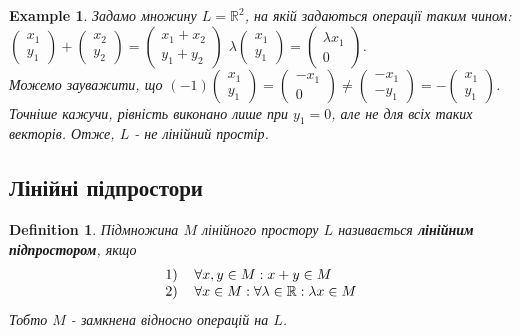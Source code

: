 \documentclass[a4paper, 10pt]{article}
\theoremstyle{theoremdd}
\theoremstyle{theoremdd}
\newtheorem{definition}[theorem]{Definition}
\theoremstyle{theoremdd}
\theoremstyle{theoremdd}
\newtheorem{example}[theorem]{Example}
\theoremstyle{theoremdd}
\theoremstyle{theoremdd}
\theoremstyle{theoremdd}
\theoremstyle{theoremdd}
\begin{document}
	\begin{example}
	Задамо множину $L = \mathbb{R}^2$, на якій задаються операції таким чином:\\
	$\begin{pmatrix}
	x_1 \\ y_1
	\end{pmatrix} + \begin{pmatrix}
	x_2 \\ y_2
	\end{pmatrix} = \begin{pmatrix}
	x_1 + x_2 \\ y_1+y_2
	\end{pmatrix}$ \hspace{1cm} $\lambda \begin{pmatrix}
	x_1 \\ y_1
	\end{pmatrix} = \begin{pmatrix}
	\lambda x_1 \\ 0
	\end{pmatrix}$.\\
	Можемо зауважити, що $(-1) \begin{pmatrix}
	x_1 \\ y_1
	\end{pmatrix} = \begin{pmatrix}
	-x_1 \\ 0
	\end{pmatrix} \neq \begin{pmatrix}
	-x_1 \\ -y_1
	\end{pmatrix} = - \begin{pmatrix}
	x_1 \\ y_1
	\end{pmatrix}$. Точніше кажучи, рівність виконано лише при $y_1 = 0$, але не для всіх таких векторів. Отже, $L$ - не лінійний простір.
	\end{example}
	
	\subsection{Лінійні підпростори}
	\begin{definition}
	Підмножина $M$ лінійного простору $L$ називається \textbf{лінійним підпростором}, якщо
	\begin{align*}
	\begin{tabular}{cl}
	1) & $\forall x, y \in M: x + y \in M$\\
	2) & $\forall x \in M: \forall \lambda \in \mathbb{R}: \lambda x \in M$\\
	\end{tabular}
	\end{align*}
	Тобто $M$ - замкнена відносно операцій на $L$.
	\end{definition}
	
\end{document}
